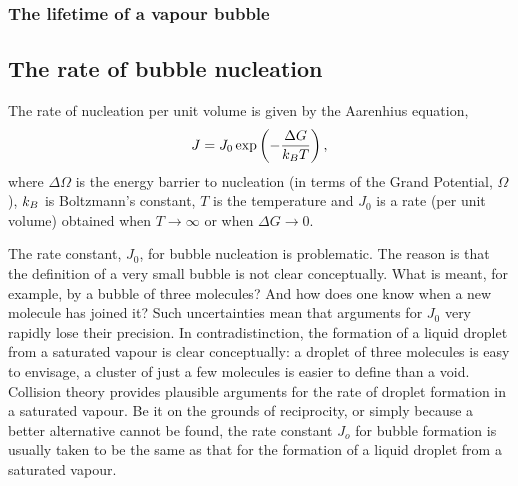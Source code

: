 

\subsubsection{The lifetime of a vapour bubble}






\subsection{The rate of bubble nucleation}


The rate of nucleation per unit volume is given by the Aarenhius equation, 
\begin{align}
J = J_0\exp \lr{-\frac{\Delta G}{\kB T}},%
\label{eqn:nuc:J}
\end{align}
where $\Delta \Omega$ is the energy barrier to nucleation (in terms of the Grand Potential, $\Omega$),
$k_B$ is Boltzmann's constant, $T$ is the temperature
and $J_0$ is a rate  (per unit volume) obtained when $T\rightarrow \infty$ or when $\Delta G \rightarrow 0$.

The rate constant, $J_0$, for bubble nucleation is problematic.
The reason is that the definition of a very small bubble is not clear conceptually.
What is meant, for example, by a bubble of three molecules?
And how does one know when a new molecule has joined it?
Such uncertainties mean that arguments for $J_0$ very rapidly lose their precision\cite{}.
In contradistinction, the formation of a liquid droplet from a saturated vapour is clear conceptually:
a droplet of three molecules is easy to envisage, 
a cluster of just a few molecules is easier to define than a void.
Collision theory provides plausible arguments for the rate of droplet formation in a saturated vapour\cite{}.
%
Be it on the grounds of reciprocity, or simply because a better alternative cannot be found,
the rate constant $J_o$ for bubble formation is usually taken to be the same 
as that for the formation of a liquid droplet from a saturated vapour.



